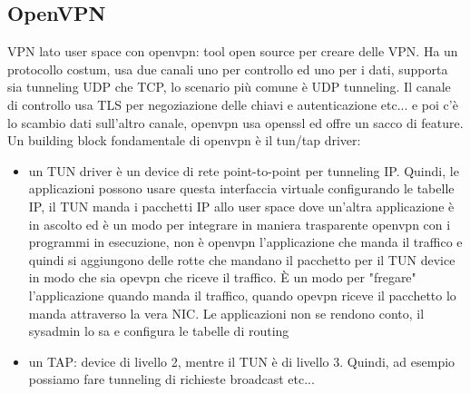 \documentclass[12pt, oneside]{extbook} %
\begin{document}
\subsection{OpenVPN}
VPN lato user space con openvpn: tool open source per creare delle VPN. Ha un protocollo costum, usa due canali uno per controllo ed uno per i dati, supporta sia tunneling UDP che TCP, lo scenario più comune è UDP tunneling. Il canale di controllo usa TLS per negoziazione delle chiavi e autenticazione etc... e poi c'è lo scambio dati sull'altro canale, openvpn usa openssl ed offre un sacco di feature.\\ Un building block fondamentale di openvpn è il tun/tap driver:
\begin{itemize}
\item un TUN driver è un device di rete point-to-point per tunneling IP. Quindi, le applicazioni possono usare questa interfaccia virtuale configurando le tabelle IP, il TUN manda i pacchetti IP allo user space dove un'altra applicazione è in ascolto ed è un modo per integrare in maniera trasparente openvpn con i programmi in esecuzione, non è openvpn l'applicazione che manda il traffico e quindi si aggiungono delle rotte che mandano il pacchetto per il TUN device in modo che sia opevpn che riceve il traffico. È un modo per "fregare" l'applicazione quando manda il traffico, quando opevpn riceve il pacchetto lo manda attraverso la vera NIC. Le applicazioni non se rendono conto, il sysadmin lo sa e configura le tabelle di routing
\item un TAP: device di livello 2, mentre il TUN è di livello 3. Quindi, ad esempio possiamo fare tunneling di richieste broadcast etc...
\end{itemize}
\end{document}
